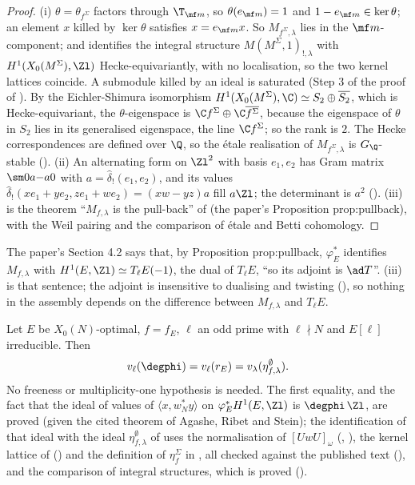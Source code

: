 \begin{proof}
(i) $\theta=\theta_{f^\Sigma}$ factors through $\T_{\mf m}$, so $\theta(e_{\mf m})=1$ and $1-e_{\mf m}\in\ker\theta$; an element $x$ killed by $\ker\theta$ satisfies $x=e_{\mf m}x$. So $M_{f^\Sigma,\lambda}$ lies in the
$\mf m$-component; and  identifies the integral structure $M(M^\Sigma,1)_{!,\lambda}$ with $H^1(X_0(M^\Sigma),\Zl)$ Hecke-equivariantly, with no localisation, so
the two kernel lattices coincide. A submodule killed by an ideal is saturated (Step 3 of the proof of ). By the Eichler-Shimura
isomorphism $H^1(X_0(M^\Sigma),\C)\simeq S_2\oplus\overline{S_2}$, which is Hecke-equivariant, the $\theta$-eigenspace is $\C f^\Sigma\oplus\C\overline{f^\Sigma}$, because the eigenspace of $\theta$ in $S_2$ lies in its
generalised eigenspace, the line $\C f^\Sigma$; so the rank is $2$. The Hecke correspondences are defined over $\Q$, so the \'etale realisation of $M_{f^\Sigma,\lambda}$ is $G_\Q$-stable
(). (ii) An alternating form on $\Zl^2$ with basis $e_1,e_2$ has Gram matrix $\sm0a{-a}0$ with $a=\hat\delta_!(e_1,e_2)$, and its values $\hat\delta_!(xe_1+ye_2,ze_1+we_2)=(xw-yz)a$ fill $a\Zl$; the
determinant is $a^2$ (). (iii) is the theorem ``$M_{f,\lambda}$ is the pull-back'' of  (the paper's Proposition prop:pullback), with the Weil pairing
and the comparison of \'etale and Betti cohomology.
\end{proof}

\begin{paperlink}
The paper's Section 4.2 says that, by Proposition prop:pullback, $\varphi_E^*$ identifies $M_{f,\lambda}$ with
$H^1(E,\Zl)\simeq T_\ell E(-1)$, the dual of $T_\ell E$, ``so its adjoint is $\ad T$''. (iii) is that sentence; the adjoint is insensitive to dualising and twisting
(), so nothing in the assembly depends on the difference between $M_{f,\lambda}$ and $T_\ell E$.
\end{paperlink}

\begin{theorem}\label{thm:congruence:lem-hecke}
Let $E$ be $X_0(N)$-optimal, $f=f_E$, $\ell$ an odd prime with $\ell\nmid N$ and $E[\ell]$ irreducible. Then
\[
v_\ell(\degphi)=v_\ell(r_E)=v_\lambda(\eta^\emptyset_{f,\lambda}).
\]
No freeness or multiplicity-one hypothesis is needed. The first equality, and the fact that the ideal of values of $\langle x,w_N^*y\rangle$ on $\varphi_E^*H^1(E,\Zl)$ is
$\degphi\,\Zl$, are proved (given the cited theorem of Agashe, Ribet and Stein); the identification of that ideal with the ideal $\eta^\emptyset_{f,\lambda}$ of \cite{DFG04} uses the normalisation of $[UwU]_\omega$ (, ), the kernel lattice of
\cite[Sections 1.1.2, 1.6.2]{DFG04} () and the definition of $\eta^\Sigma_f$ in \cite[Section 1.7.3]{DFG04}, all checked against the published text
(), and the comparison of integral structures, which is proved ().
\end{theorem}

